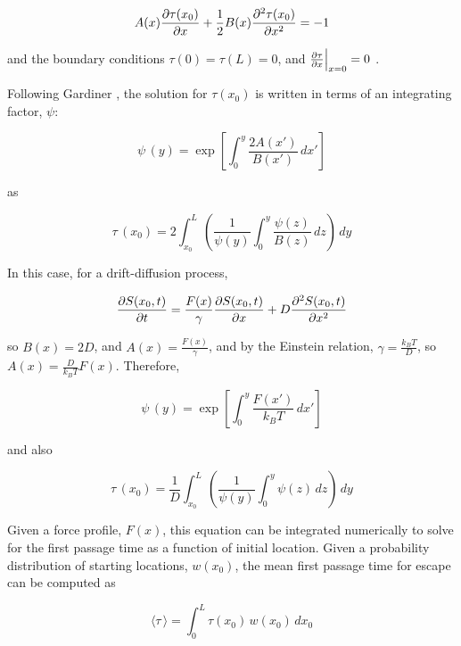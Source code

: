 \begin{equation}
A(x) \frac{\partial \tau (x_0)}{\partial x} + \frac{1}{2} B(x) \frac{\partial^2 \tau (x_0)}{\partial x^2} = -1
\label{eqn:first_passage}
\end{equation}

and the boundary conditions $\tau(0)=\tau(L)=0$, and $\frac{\partial \tau}{\partial x} \Bigr|_{x=0} =0$ .

Following Gardiner \citep{Gardiner1985}, the solution for $\tau (x_0)$ is written in terms of an integrating factor, $\psi$:

\begin{equation}
\psi \, (y) = \exp \left [ \int_0^y \frac{2A(x')}{B(x')} \,dx' \right ]
\label{eqn:psi}
\end{equation}

as

\begin{equation}
\tau \, (x_0) = 2 \int_{x_0}^{L} \left ( \frac{1}{\psi(y)} \int_{0}^{y} \frac{\psi(z)}{B(z)} \,dz \right ) \,dy
\label{eqn:first_passage_sol}
\end{equation}

In this case, for a drift-diffusion process,

\begin{equation}
\frac{\partial S(x_0,t)}{\partial t} = \frac{F(x)}{\gamma} \frac{\partial S(x_0,t)}{\partial x} + D \frac{\partial^2 S(x_0,t)}{\partial x^2}
\label{eqn:smoluchowski_final}
\end{equation}

so $B(x) = 2D$, and $A(x) = \frac{F(x)}{\gamma}$, and by the Einstein relation, $\gamma = \frac{k_B T}{D}$, so $A(x) = \frac{D}{k_B T} F(x)$.  Therefore,

\begin{equation}
\psi \, (y) = \exp \left [ \int_0^y  \frac{F(x')}{k_B T} \,dx' \right ]
\label{eqn:psi2}
\end{equation}

and also

\begin{equation}
\tau \, (x_0) = \frac{1}{D} \int_{x_0}^{L} \left ( \frac{1}{\psi(y)} \int_{0}^{y} \psi(z) \,dz \right ) \,dy
\label{eqn:first_passage_sol}
\end{equation}

Given a force profile, $F(x)$, this equation can be integrated numerically to solve for the first passage time as a function of initial location.  Given a probability distribution of starting locations, $w(x_0)$, the mean first passage time for escape can be computed as

\begin{equation}
\langle \tau \, \rangle = \int_{0}^{L} \tau(x_0) \, w(x_0) \,dx_0
\label{eqn:mean_first_passage_sol}
\end{equation}